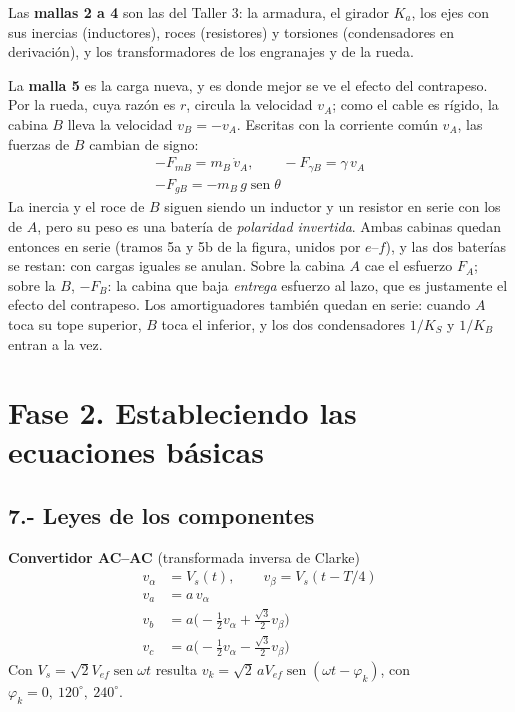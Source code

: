 \documentclass[10pt,a4paper,twocolumn]{article}
\DeclareMathOperator{\sen}{sen}
\begin{document}
Las \textbf{mallas 2 a 4} son las del Taller 3: la armadura, el girador $K_a$, los ejes con
sus inercias (inductores), roces (resistores) y torsiones (condensadores en derivación), y
los transformadores de los engranajes y de la rueda.

La \textbf{malla 5} es la carga nueva, y es donde mejor se ve el efecto del contrapeso.
Por la rueda, cuya razón es $r$, circula la velocidad $v_A$; como el cable es rígido, la
cabina $B$ lleva la velocidad $v_B=-v_A$. Escritas con la corriente común $v_A$, las fuerzas
de $B$ cambian de signo:
\begin{gather*}
  -F_{mB} = m_B\,\dot v_A, \qquad -F_{\gamma B} = \gamma\,v_A \\
  -F_{gB} = -m_B\,g\sen\theta
\end{gather*}
La inercia y el roce de $B$ siguen siendo un inductor y un resistor en serie con los de
$A$, pero su peso es una batería de \emph{polaridad invertida}. Ambas cabinas quedan
entonces en serie (tramos 5a y 5b de la figura, unidos por $e$--$f$), y las dos baterías
se restan: con cargas iguales se anulan. Sobre la cabina $A$ cae el esfuerzo $F_A$; sobre
la $B$, $-F_B$: la cabina que baja \emph{entrega} esfuerzo al lazo, que es justamente el
efecto del contrapeso. Los amortiguadores también quedan en serie: cuando $A$ toca su tope
superior, $B$ toca el inferior, y los dos condensadores $1/K_S$ y $1/K_B$ entran a la vez.

\section*{Fase 2. Estableciendo las ecuaciones básicas}

\subsection*{7.- Leyes de los componentes}

\noindent\textbf{Convertidor AC--AC} (transformada inversa de Clarke)
\begin{align*}
  v_\alpha &= V_s(t), \qquad v_\beta = V_s(t - T/4) \\
  v_a &= a\,v_\alpha \\
  v_b &= a\big(-\tfrac12 v_\alpha + \tfrac{\sqrt3}{2} v_\beta\big) \\
  v_c &= a\big(-\tfrac12 v_\alpha - \tfrac{\sqrt3}{2} v_\beta\big)
\end{align*}
Con $V_s = \sqrt2 V_{ef}\sen\omega t$ resulta $v_k = \sqrt2\,a V_{ef}
\sen(\omega t - \varphi_k)$, con $\varphi_k = 0,\ 120^\circ,\ 240^\circ$.
\end{document}

